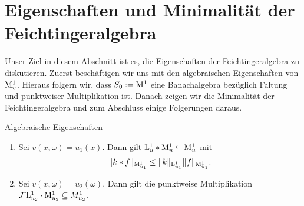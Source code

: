 \section{Eigenschaften und Minimalität der Feichtingeralgebra}

Unser Ziel in diesem Abschnitt ist es, die Eigenschaften der Feichtingeralgebra zu diskutieren.
Zuerst beschäftigen wir uns mit den algebraischen Eigenschaften von $ \mathrm{M}^1_v $.
Hieraus folgern wir, dass $ S_0 := \mathrm{M}^1 $ eine Banachalgebra  bezüglich Faltung und punktweiser Multiplikation ist.
Danach zeigen wir die Minimalität der Feichtingeralgebra und zum Abschluss einige Folgerungen daraus.


\begin{genericthm}{Algebraische Eigenschaften}\label{th:algebraic_properties}
	\begin{enumerate}[label =\textbf{(\roman*)}]
		\item Sei $ v(x,\omega) = u_1(x)$. Dann gilt $ \mathrm{L}^1_u \ast \mathrm{M}_u^1 \subseteq \mathrm{M}^1_u $ mit
		\begin{align*}
		\| k \ast f \|_{\mathrm{M}^1_{u_1}} \leq \| k \|_{\mathrm{L}^1_{u_1}} \| f \|_{\mathrm{M}^1_{u_1}}.
		\end{align*}
		\item 
		Sei $ v(x,\omega) = u_2(\omega) $. Dann gilt die punktweise Multiplikation $ \mathcal{F} \mathrm{L}^1_{u_2} \cdot \mathrm{M}_{u_2}^1 \subseteq M_{u_2}^1 $.
	\end{enumerate}
\end{genericthm}

